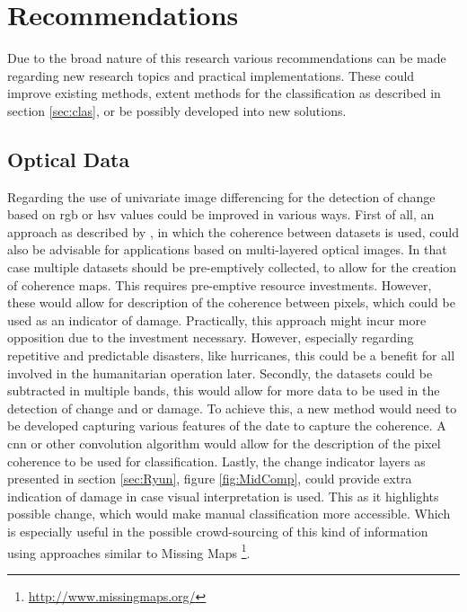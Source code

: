 \chapter{Recommendations} \label{reco}
Due to the broad nature of this research various recommendations can be made regarding new research topics and practical implementations. These could improve existing methods, extent methods for the classification as described in section \ref{sec:clas}, or be possibly developed into new solutions.\\

\section{Optical Data}
Regarding the use of univariate image differencing for the detection of change based on \ac{rgb} or \ac{hsv} values could be improved in various ways. First of all, an approach as described by \citet{Yun2015}, in which the coherence between datasets is used, could also be advisable for applications based on multi-layered optical images. In that case multiple datasets should be pre-emptively collected, to allow for the creation of coherence maps. This requires pre-emptive resource investments. However, these would allow for description of the coherence between pixels, which could be used as an indicator of damage. Practically, this approach might incur more opposition due to the investment necessary. However, especially regarding repetitive and predictable disasters, like hurricanes, this could be a benefit for all involved in the humanitarian operation later.
Secondly, the datasets could be subtracted in multiple bands, this would allow for more data to be used in the detection of change and or damage. To achieve this, a new method would need to be developed capturing various features of the date to capture the coherence. A \ac{cnn} or other convolution algorithm would allow for the description of the pixel coherence to be used for classification.
Lastly, the change indicator layers as presented in section \ref{sec:Ryun}, figure \ref{fig:MidComp}, could provide extra indication of damage in case visual interpretation is used. This as it highlights possible change, which would make manual classification more accessible. Which is especially useful in the possible crowd-sourcing of this kind of information using approaches similar to Missing Maps \footnote{\url{http://www.missingmaps.org/}}.\\

